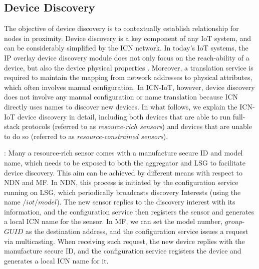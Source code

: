 \subsection{Device Discovery}
The objective of device discovery is to contextually establish relationship for nodes in proximity. Device discovery is a key component of any IoT system, and can be considerably simplified by the ICN network. In today's IoT systems, the IP overlay device discovery module does not only focus on the reach-ability of a device, but also the device physical properties \cite{iotivity,alljoyn}. Moreover, a translation service is required to maintain the mapping from network addresses to physical attributes, which often involves manual configuration. In ICN-IoT, however, device discovery does not involve any manual configuration or name translation because ICN directly uses names to discover new devices. In what follows, we explain the ICN-IoT device discovery  in detail, including both devices that are able to run  full-stack protocols (referred to as \emph{resource-rich sensors}) and devices that are unable to do so (referred to as \emph{resource-constrained sensors}).

\vspace{1mm}: Many a resource-rich sensor comes with a manufacture secure ID and model name, which needs to be exposed to both the aggregator and LSG to facilitate device discovery. This aim can be achieved by different means with respect to NDN and MF.  In NDN, this process is initiated by the configuration service running on LSG, which periodically broadcasts discovery Interests (using the name $/iot/model$). The new sensor replies to the discovery interest with its information, and the configuration service then registers the sensor and generates a local ICN name for the sensor. In MF, we can set the model number, $group$-$GUID$ as the destination address, and the configuration service issues a request via multicasting. When receiving such request, the new device replies with the manufacture secure ID, and the configuration service registers the device and  generates a local ICN name for it.


